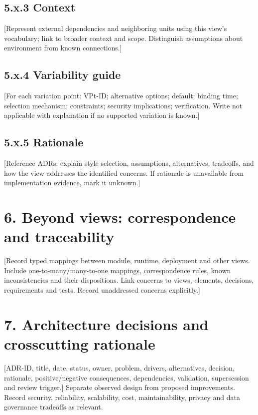 \documentclass[11pt,letterpaper]{article}
\begin{document}
\subsection*{5.x.3 Context}
[Represent external dependencies and neighboring units using this view's vocabulary; link to broader context and scope. Distinguish assumptions about environment from known connections.]\par\smallskip
\subsection*{5.x.4 Variability guide}
[For each variation point: VPt-ID; alternative options; default; binding time; selection mechanism; constraints; security implications; verification. Write not applicable with explanation if no supported variation is known.]\par\smallskip
\subsection*{5.x.5 Rationale}
[Reference ADRs; explain style selection, assumptions, alternatives, tradeoffs, and how the view addresses the identified concerns. If rationale is unavailable from implementation evidence, mark it unknown.]\par\smallskip
\section*{6. Beyond views: correspondence and traceability}
[Record typed mappings between module, runtime, deployment and other views. Include one-to-many/many-to-one mappings, correspondence rules, known inconsistencies and their dispositions. Link concerns to views, elements, decisions, requirements and tests. Record unaddressed concerns explicitly.]\par\smallskip
\section*{7. Architecture decisions and crosscutting rationale}
[ADR-ID, title, date, status, owner, problem, drivers, alternatives, decision, rationale, positive/negative consequences, dependencies, validation, supersession and review trigger.] Separate observed design from proposed improvements. Record security, reliability, scalability, cost, maintainability, privacy and data governance tradeoffs as relevant.\par\smallskip
\end{document}
